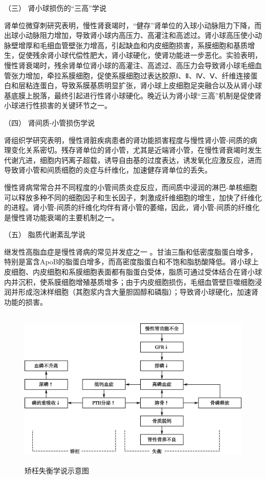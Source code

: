 \hypertarget{text00085.htmlux5cux23CHP3-8-5-2-3}{}
（三） 肾小球损伤的“三高”学说

肾单位微穿刺研究表明，慢性肾衰竭时，“健存”肾单位的入球小动脉阻力下降，而出球小动脉阻力增加，导致肾小球内高压力、高灌注和高滤过。肾小球高压使小动脉壁增厚和毛细血管壁张力增高，引起缺血和内皮细胞损害，系膜细胞和基质增生，促使残余肾小球代偿性肥大，肾小球硬化，使肾功能进一步恶化。实验表明，慢性肾衰竭时，残余肾单位肾小球的高灌注、高滤过、高压力会导致肾小球毛细血管张力增加，牵拉系膜细胞，促使系膜细胞过表达胶原Ⅰ、Ⅱ、Ⅳ、Ⅴ、纤维连接蛋白和层粘连蛋白，导致系膜基质明显扩张，肾小球上皮细胞足突融合以及从肾小球基底膜上脱落，最终引起进行性肾小球硬化。晚近认为肾小球“三高”机制是促使肾小球进行性损害的关键环节之一。

\hypertarget{text00085.htmlux5cux23CHP3-8-5-2-4}{}
（四） 肾间质-小管损伤学说

肾组织学研究表明，慢性肾脏疾病患者的肾功能损害程度与慢性肾小管-间质的病理变化关系密切。残存肾单位的肾小管，尤其是近端肾小管，在慢性肾衰竭时发生代谢亢进，细胞内钙离子超载，诱导自由基的过度表达，诱发氧化应激反应，进而导致肾小管和间质细胞的炎症与纤维化，加速健存肾单位的丢失。

慢性肾病常常合并不同程度的小管间质炎症反应，而间质中浸润的淋巴-单核细胞可以释放多种不同的细胞因子和生长因子，刺激成纤维细胞的增生，加快了纤维化的进程。肾小管-间质的纤维化均伴有肾小管的萎缩，因此，肾小管-间质的纤维化是慢性肾功能衰竭的主要机制之一。

\hypertarget{text00085.htmlux5cux23CHP3-8-5-2-5}{}
（五） 脂质代谢紊乱学说

继发性高脂血症是慢性肾病的常见并发症之一
。甘油三酯和低密度脂蛋白增多，特别是富含ApoB的脂蛋白增多，而高密度脂蛋白和不饱和脂肪酸降低。肾小球上皮细胞、内皮细胞和系膜细胞表面都有脂蛋白受体，脂质可通过受体结合在肾小球内并沉积，使系膜细胞增殖基质增多；由于内皮细胞损伤，毛细血管壁巨噬细胞浸润并形成泡沫样细胞（其胞浆内含大量胆固醇和磷脂）；导致肾小球硬化，加速肾功能的损害。

\begin{figure}[!htbp]
 \centering
 \includegraphics[width=5.02083in,height=3.03125in]{./images/Image00122.jpg}
 \captionsetup{justification=centering}
 \caption{矫枉失衡学说示意图}
 \label{fig32-1}
  \end{figure} 

